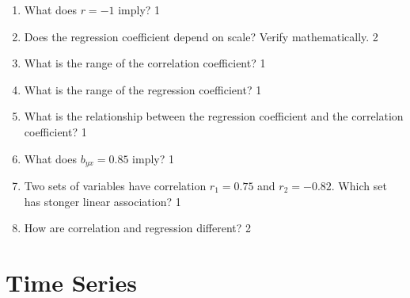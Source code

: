 \documentclass[a4paper,oneside]{book}
\begin{document}
  \begin{enumerate}
  \item What does $r=-1$ imply? \hfill 1
  \item Does the regression coefficient depend on scale? Verify mathematically. \hfill 2
  \item What is the range of the correlation coefficient?  \hfill 1
  \item What is the range of the regression coefficient? \hfill 1
  \item What is the relationship between the regression coefficient and the correlation coefficient? \hfill 1
  \item What does $b_{yx} = 0.85$ imply? \hfill 1
  \item Two sets of variables have correlation $r_1 = 0.75$ and $r_2 = -0.82$. Which set has stonger linear association? \hfill 1
  \item How are correlation and regression different? \hfill 2
  \end{enumerate}

\chapter{Time Series} 
\end{document}
